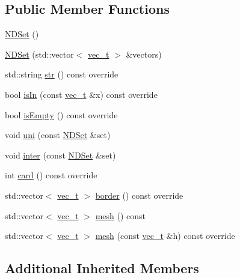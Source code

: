 \subsection*{Public Member Functions}
\begin{DoxyCompactItemize}
\item 
\mbox{\hyperlink{class_n_d_set_a906983146babefe3d4824d282887c083}{N\+D\+Set}} ()
\item 
\mbox{\hyperlink{class_n_d_set_a2f01f90688a50dffc1b1b19ab3e34a7f}{N\+D\+Set}} (std\+::vector$<$ \mbox{\hyperlink{_n_vector_8h_a0a2cfc67e738a3d73e4f12098c4c07f6}{vec\+\_\+t}} $>$ \&vectors)
\item 
std\+::string \mbox{\hyperlink{class_n_d_set_ada343b5d74ced1894dfe098c6324d61e}{str}} () const override
\item 
bool \mbox{\hyperlink{class_n_d_set_a0023b3999000c4d5ed05704d7346466d}{is\+In}} (const \mbox{\hyperlink{_n_vector_8h_a0a2cfc67e738a3d73e4f12098c4c07f6}{vec\+\_\+t}} \&x) const override
\item 
bool \mbox{\hyperlink{class_n_d_set_aafdebcaf09b5efa04872041e4449190c}{is\+Empty}} () const override
\item 
void \mbox{\hyperlink{class_n_d_set_ae32071d88d0a669e3e397ec20ef16cd5}{uni}} (const \mbox{\hyperlink{class_n_d_set}{N\+D\+Set}} \&set)
\item 
void \mbox{\hyperlink{class_n_d_set_abf13bbb9169af9e4b507fc8fcfb83232}{inter}} (const \mbox{\hyperlink{class_n_d_set}{N\+D\+Set}} \&set)
\item 
int \mbox{\hyperlink{class_n_d_set_a683386499ad6a9de65e0197f2846d8de}{card}} () const override
\item 
std\+::vector$<$ \mbox{\hyperlink{_n_vector_8h_a0a2cfc67e738a3d73e4f12098c4c07f6}{vec\+\_\+t}} $>$ \mbox{\hyperlink{class_n_d_set_a3020476b78835439f6474845d30f00ff}{border}} () const override
\item 
std\+::vector$<$ \mbox{\hyperlink{_n_vector_8h_a0a2cfc67e738a3d73e4f12098c4c07f6}{vec\+\_\+t}} $>$ \mbox{\hyperlink{class_n_d_set_a18273bfd133548e2012d1c8bd7cf566c}{mesh}} () const
\item 
std\+::vector$<$ \mbox{\hyperlink{_n_vector_8h_a0a2cfc67e738a3d73e4f12098c4c07f6}{vec\+\_\+t}} $>$ \mbox{\hyperlink{class_n_d_set_ae57fe6ad1422876fa4256a28c3a26a13}{mesh}} (const \mbox{\hyperlink{_n_vector_8h_a0a2cfc67e738a3d73e4f12098c4c07f6}{vec\+\_\+t}} \&h) const override
\end{DoxyCompactItemize}
\subsection*{Additional Inherited Members}


